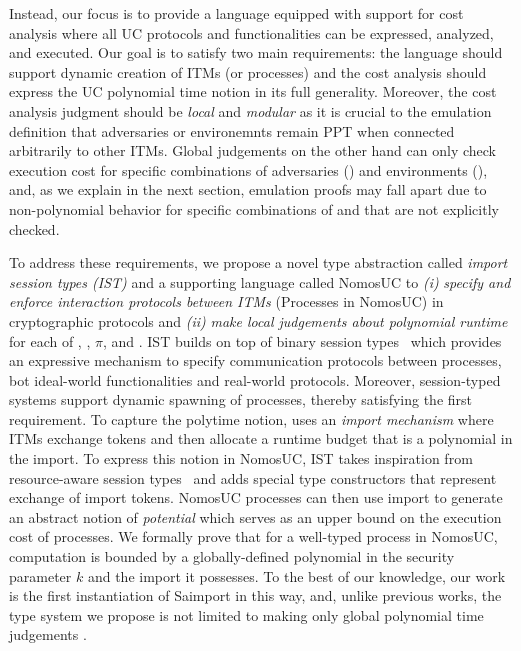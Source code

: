 Instead, our focus is to provide a language equipped with support for cost
analysis where all UC protocols and functionalities can be expressed, analyzed,
and executed.  Our goal is to satisfy two main requirements: the language
should support dynamic creation of ITMs (or processes) and the cost analysis
should express the UC polynomial time notion in its full generality.
Moreover, the cost analysis judgment should be
\emph{local} and \emph{modular} as it is crucial to the emulation definition
that adversaries or environemnts remain PPT when connected arbitrarily to other
ITMs.  Global judgements on the other hand can only check execution cost for
specific combinations of adversaries (\A) and environments (\Z), and, as we
explain in the next section, emulation proofs may fall apart due to
non-polynomial behavior for specific combinations of \Z and \A that are not
explicitly checked.

To address these requirements, we propose a novel type abstraction called
\emph{import session types (IST)} and a supporting language called NomosUC to
\emph{(i)} \emph{specify and enforce interaction protocols between ITMs}
(Processes in NomosUC) in cryptographic protocols and \emph{(ii)} \emph{make
local judgements about polynomial runtime} for each of \A, \F, $\pi$, and \Z.
IST builds on top of binary session
types~\cite{HondaCONCUR1993,HondaESOP1998,HondaPOPL2008,caires2010session,ToninhoESOP2013}
which provides an expressive mechanism to specify communication protocols
between processes, bot ideal-world functionalities and real-world
protocols.  Moreover, session-typed systems support dynamic spawning of
processes, thereby satisfying the first requirement.  To capture the polytime
notion, \cite{canettiUC} uses an \emph{import mechanism} where ITMs exchange
tokens and then allocate a runtime budget that is a polynomial in the import.
To express this notion in NomosUC, IST takes inspiration from resource-aware
session types~\cite{das2018work,dasnomos,Das20arxiv} and adds special type
constructors that represent exchange of import tokens.  NomosUC processes can
then use import to generate an abstract notion of \emph{potential} which serves
as an upper bound on the execution cost of processes.  We formally prove that
for a well-typed process in NomosUC, computation is bounded by a
globally-defined polynomial in the security parameter $k$ and the import it
possesses.  To the best of our knowledge, our work is the first instantiation of
Saimport in this way, and, unlike previous works, the type system we propose is
not limited to making only global polynomial time judgements \cite{ilc, ipdl}.

